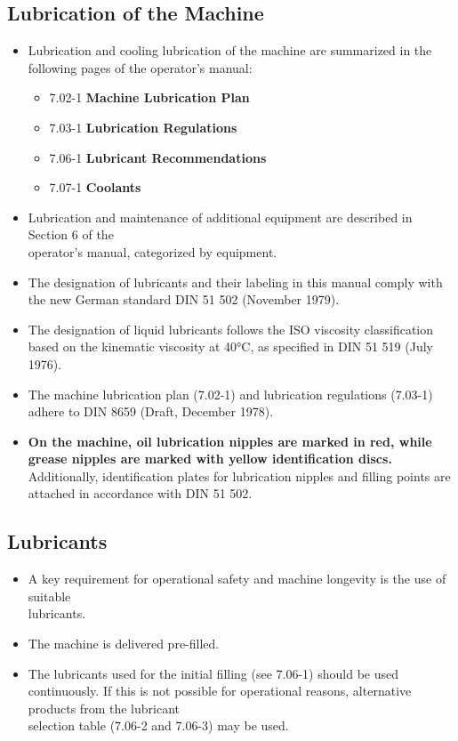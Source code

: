 

\subsection*{Lubrication of the Machine}
\begin{itemize}
    \item Lubrication and cooling lubrication of the machine are summarized in the following pages of the operator's manual:
    \begin{itemize}
        \item 7.02-1 \textbf{Machine Lubrication Plan}
        \item 7.03-1 \textbf{Lubrication Regulations}
        \item 7.06-1 \textbf{Lubricant Recommendations}
        \item 7.07-1 \textbf{Coolants}
    \end{itemize}
    \item Lubrication and maintenance of additional equipment are described in Section 6 of the \\operator's manual, categorized by equipment.
    \item The designation of lubricants and their labeling in this manual comply with the new German standard DIN 51 502 (November 1979).
    \item The designation of liquid lubricants follows the ISO viscosity classification based on the kinematic viscosity at 40°C, as specified in DIN 51 519 (July 1976).
    \item The machine lubrication plan (7.02-1) and lubrication regulations (7.03-1) adhere to DIN 8659 (Draft, December 1978).
    \item \textbf{On the machine, oil lubrication nipples are marked in red, while grease nipples are marked with yellow identification discs.} Additionally, identification plates for lubrication nipples and filling points are attached in accordance with DIN 51 502.
\end{itemize}

\subsection*{Lubricants}
\begin{itemize}
    \item A key requirement for operational safety and machine longevity is the use of suitable \\lubricants.
    \item The machine is delivered pre-filled\footnotemark.
    \item The lubricants used for the initial filling (see 7.06-1) should be used continuously. If this is not possible for operational reasons, alternative products from the lubricant \\selection table (7.06-2 and 7.06-3) may be used.
\end{itemize}

